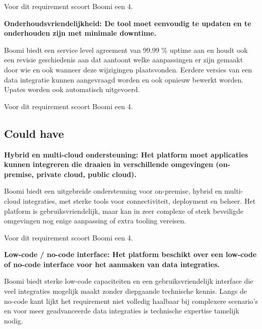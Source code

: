 Voor dit requirement scoort Boomi een 4.

\vspace{\baselineskip}

\textbf{Onderhoudsvriendelijkheid: De tool moet eenvoudig te updaten en te onderhouden zijn met minimale downtime.}

\vspace{\baselineskip}

Boomi biedt een service level agreement van 99.99 \% uptime aan en houdt ook een revisie geschiedenis aan dat aantoont welke aanpassingen er zijn gemaakt door wie en ook wanneer deze wijzigingen plaatsvonden. Eerdere versies van een data integratie kunnen aangevraagd worden en ook opnieuw bewerkt worden. Upates worden ook automatisch uitgevoerd.

Voor dit requirement scoort Boomi een 4.

\vspace{\baselineskip}

\subsection{Could have}%
\label{CouldHaveBoomi}

\textbf{Hybrid en multi-cloud ondersteuning: Het platform moet applicaties kunnen integreren die draaien in verschillende omgevingen (on-premise, private cloud, public cloud).}

\vspace{\baselineskip}

Boomi biedt een uitgebreide ondersteuning voor on-premise, hybrid en multi-cloud integraties, met sterke tools voor connectiviteit, deployment en beheer. Het platform is gebruiksvriendelijk, maar kan in zeer complexe of sterk beveiligde omgevingen nog enige aanpassing of extra tooling vereisen.

Voor dit requirement scoort Boomi een 4.

\vspace{\baselineskip}

\textbf{Low-code / no-code interface: Het platform beschikt over een low-code of no-code interface voor het aanmaken van data integraties.}

\vspace{\baselineskip}

Boomi biedt sterke low-code capaciteiten en een gebruiksvriendelijk interface die veel integraties mogelijk maakt zonder diepgaande technische kennis. Langs de no-code kant lijkt het requirement niet volledig haalbaar bij complexere scenario's en voor meer geadvanceerde data integraties is technische expertise tamelijk nodig.

